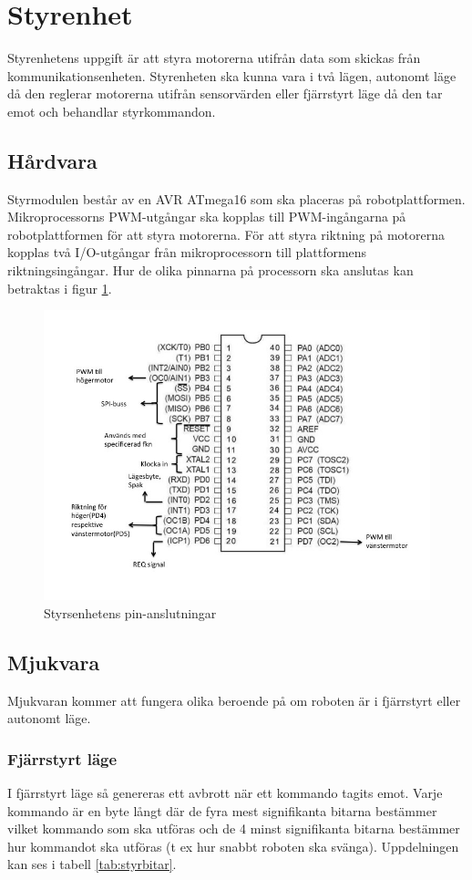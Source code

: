 \section{Styrenhet}
Styrenhetens uppgift är att styra motorerna utifrån data som skickas från kommunikationsenheten.
Styrenheten ska kunna vara i två lägen, autonomt läge då den reglerar motorerna utifrån sensorvärden eller 
fjärrstyrt läge då den tar emot och behandlar styrkommandon.
\subsection{Hårdvara}
Styrmodulen består av en AVR ATmega16 som ska placeras på robotplattformen.
Mikroprocessorns PWM-utgångar ska kopplas till PWM-ingångarna på robotplattformen för att styra motorerna.
För att styra riktning på motorerna kopplas två I/O-utgångar från mikroprocessorn till plattformens riktningsingångar.
Hur de olika pinnarna på processorn ska anslutas kan betraktas i figur \ref{fig:PINstyr}.

\begin{figure}[H]
  \centering
 \includegraphics[angle=0,scale=0.5]{bilder/PIN_styr.jpg}
  \caption{Styrsenhetens pin-anslutningar}
  \label{fig:PINstyr}
\end{figure}


\subsection{Mjukvara}
Mjukvaran kommer att fungera olika beroende på om roboten är i fjärrstyrt eller autonomt läge.
\subsubsection{Fjärrstyrt läge}
I fjärrstyrt läge så genereras ett avbrott när ett kommando tagits emot.
Varje kommando är en byte långt där de fyra mest signifikanta bitarna bestämmer vilket kommando som ska utföras
och de 4 minst signifikanta bitarna bestämmer hur kommandot ska utföras (t ex hur snabbt roboten ska svänga).
Uppdelningen kan ses i tabell \ref{tab:styrbitar}.

